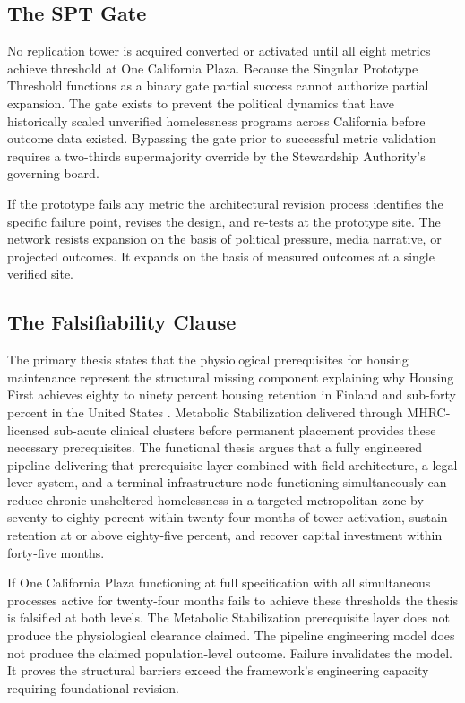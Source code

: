 \documentclass[12pt, letterpaper]{article}
\begin{document}
\subsection{The SPT Gate}

No replication tower is acquired converted or activated until all eight metrics achieve threshold at One California Plaza. Because the Singular Prototype Threshold functions as a binary gate partial success cannot authorize partial expansion. The gate exists to prevent the political dynamics that have historically scaled unverified homelessness programs across California before outcome data existed. Bypassing the gate prior to successful metric validation requires a two-thirds supermajority override by the Stewardship Authority's governing board.

If the prototype fails any metric the architectural revision process identifies the specific failure point, revises the design, and re-tests at the prototype site. The network resists expansion on the basis of political pressure, media narrative, or projected outcomes. It expands on the basis of measured outcomes at a single verified site.

\subsection{The Falsifiability Clause}

The primary thesis states that the physiological prerequisites for housing maintenance represent the structural missing component explaining why Housing First achieves eighty to ninety percent housing retention in Finland and sub-forty percent in the United States \citep{ucsf_bhhi_2023}. Metabolic Stabilization delivered through MHRC-licensed sub-acute clinical clusters before permanent placement provides these necessary prerequisites. The functional thesis argues that a fully engineered pipeline delivering that prerequisite layer combined with field architecture, a legal lever system, and a terminal infrastructure node functioning simultaneously can reduce chronic unsheltered homelessness in a targeted metropolitan zone by seventy to eighty percent within twenty-four months of tower activation, sustain retention at or above eighty-five percent, and recover capital investment within forty-five months.

If One California Plaza functioning at full specification with all simultaneous processes active for twenty-four months fails to achieve these thresholds the thesis is falsified at both levels. The Metabolic Stabilization prerequisite layer does not produce the physiological clearance claimed. The pipeline engineering model does not produce the claimed population-level outcome. Failure invalidates the model. It proves the structural barriers exceed the framework's engineering capacity requiring foundational revision.
\end{document}
